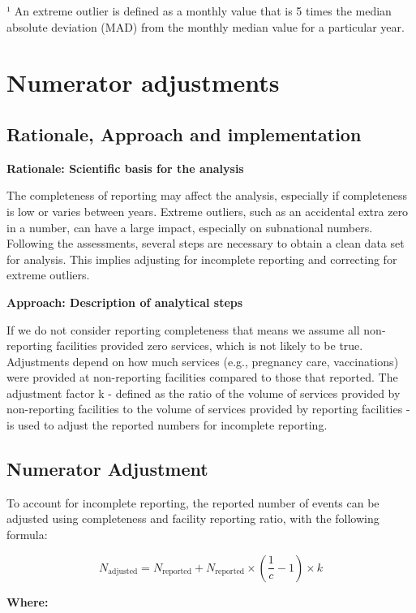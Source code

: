 \documentclass[
  english,
  letterpaper,
  DIV=11,
  numbers=noendperiod]{scrreprt}
\begin{document}
¹ An extreme outlier is defined as a monthly value that is 5 times the
median absolute deviation (MAD) from the monthly median value for a
particular year.

\chapter{Numerator adjustments}\label{numerator-adjustments}

\section{Rationale, Approach and
implementation}\label{sec-dqa-adjust-science}

\textbf{Rationale: Scientific basis for the analysis}

The completeness of reporting may affect the analysis, especially if
completeness is low or varies between years. Extreme outliers, such as
an accidental extra zero in a number, can have a large impact,
especially on subnational numbers. Following the assessments, several
steps are necessary to obtain a clean data set for analysis. This
implies adjusting for incomplete reporting and correcting for extreme
outliers.

\textbf{Approach: Description of analytical steps}

If we do not consider reporting completeness that means we assume all
non-reporting facilities provided zero services, which is not likely to
be true. Adjustments depend on how much services (e.g., pregnancy care,
vaccinations) were provided at non-reporting facilities compared to
those that reported. The adjustment factor k - defined as the ratio of
the volume of services provided by non-reporting facilities to the
volume of services provided by reporting facilities - is used to adjust
the reported numbers for incomplete reporting.

\section{Numerator Adjustment}\label{sec-numerator-adjustment}

To account for incomplete reporting, the reported number of events can
be adjusted using completeness and facility reporting ratio, with the
following formula:

\[
N_{\text{adjusted}} = N_{\text{reported}} + N_{\text{reported}} \times \left( \frac{1}{c} - 1 \right) \times k
\]

\textbf{Where:}
\end{document}
